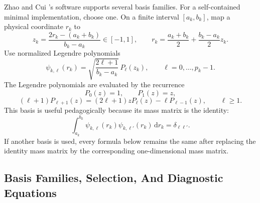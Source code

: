 \documentclass[11pt]{article}
\numberwithin{equation}{section}
\newcommand{\dd}{\,\mathrm d}
\begin{document}
Zhao and Cui \cite{zhao2024ttsequential}'s software supports several basis families.  For a self-contained
minimal implementation, choose one.  On a finite interval
\([a_k,b_k]\), map a physical coordinate \(r_k\) to
\begin{equation}
    z_k=\frac{2r_k-(a_k+b_k)}{b_k-a_k}\in[-1,1],
    \qquad
    r_k=\frac{a_k+b_k}{2}+\frac{b_k-a_k}{2}z_k.
    \label{eq:p24-tt-6}
\end{equation}
Use normalized Legendre polynomials
\begin{equation}
    \psi_{k,\ell}(r_k)
    =
    \sqrt{\frac{2\ell+1}{b_k-a_k}}\,
    P_\ell(z_k),
    \qquad \ell=0,\ldots,p_k-1.
    \label{eq:p24-tt-7}
\end{equation}
The Legendre polynomials are evaluated by the recurrence
\[
    P_0(z)=1,\qquad P_1(z)=z,
\]
\begin{equation}
    (\ell+1)P_{\ell+1}(z)
    =
    (2\ell+1)zP_\ell(z)-\ell P_{\ell-1}(z),
    \qquad \ell\ge1.
    \label{eq:p24-tt-8}
\end{equation}
This basis is useful pedagogically because its mass matrix is the identity:
\begin{equation}
    \int_{a_k}^{b_k}\psi_{k,\ell}(r_k)\psi_{k,\ell'}(r_k)\dd r_k
    =
    \delta_{\ell\ell'}.
    \label{eq:p24-tt-9}
\end{equation}
If another basis is used, every formula below remains the same after replacing
the identity mass matrix by the corresponding one-dimensional mass matrix.

\subsection{Basis Families, Selection, And Diagnostic Equations}
\label{subsec:p30-basis-defense}
\end{document}
